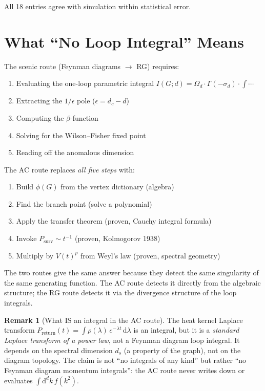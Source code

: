 \documentclass[11pt,a4paper]{article}
\theoremstyle{definition}
\newtheorem*{remark}{Remark}
\newcommand{\dd}{\mathrm{d}}
\newcommand{\Psurv}{P_{\mathrm{surv}}}
\newcommand{\Preturn}{P_{\mathrm{return}}}
\begin{document}
\noindent
All 18 entries agree with simulation within statistical error.

\section{What ``No Loop Integral'' Means}
\label{sec:discussion}

The scenic route (Feynman diagrams $\to$ RG) requires:
\begin{enumerate}
\item Evaluating the one-loop parametric integral
      $I(G; d) = \Omega_d \cdot \Gamma(-\sigma_d) \cdot \int \cdots$
\item Extracting the $1/\epsilon$ pole ($\epsilon = d_c - d$)
\item Computing the $\beta$-function
\item Solving for the Wilson--Fisher fixed point
\item Reading off the anomalous dimension
\end{enumerate}

The AC route replaces \emph{all five steps} with:
\begin{enumerate}
\item Build $\phi(G)$ from the vertex dictionary (algebra)
\item Find the branch point (solve a polynomial)
\item Apply the transfer theorem (proven, Cauchy integral formula)
\item Invoke $\Psurv \sim t^{-1}$ (proven, Kolmogorov 1938)
\item Multiply by $V(t)^p$ from Weyl's law (proven, spectral geometry)
\end{enumerate}

The two routes give the same answer because they detect the same singularity
of the same generating function. The AC route detects it directly from the
algebraic structure; the RG route detects it via the divergence structure of
the loop integrals.

\begin{remark}[What IS an integral in the AC route]
The heat kernel Laplace transform $\Preturn(t) = \int \rho(\lambda)\,
e^{-\lambda t}\,\dd\lambda$ is an integral, but it is a \emph{standard
Laplace transform of a power law}, not a Feynman diagram loop integral.
It depends on the spectral dimension $d_s$ (a property of the graph),
not on the diagram topology. The claim is not ``no integrals of any kind''
but rather ``no Feynman diagram momentum integrals'': the AC route never
writes down or evaluates $\int \dd^d k\, f(k^2)$.
\end{remark}
\end{document}
